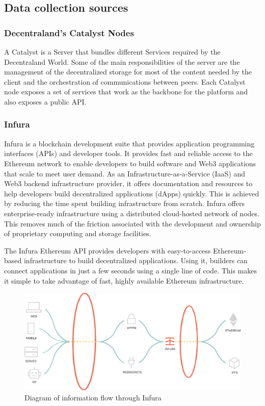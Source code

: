 \documentclass[MSE,Master,english]{twbook}%
\begin{document}
\subsection{Data collection sources}
\subsubsection{Decentraland's Catalyst Nodes}
A Catalyst\cite{catalyst} is a Server that bundles different Services required by the Decentraland World. Some of the main responsibilities of the server are the management of the decentralized storage for most of the content needed by the client and the orchestration of communications between peers. Each Catalyst node exposes a set of services that work as the backbone for the platform and also exposes a public API.


\subsubsection{Infura}
Infura\cite{infura} is a blockchain development suite that provides application programming interfaces (APIs) and developer tools. It provides fast and reliable access to the Ethereum network to enable developers to build software and Web3 applications that scale to meet user demand.
As an Infrastructure-as-a-Service (IaaS) and Web3 backend infrastructure provider, it offers documentation and resources to help developers build decentralized applications (dApps) quickly. This is achieved by reducing the time spent building infrastructure from scratch. Infura offers enterprise-ready infrastructure using a distributed cloud-hosted network of nodes. This removes much of the friction associated with the development and ownership of proprietary computing and storage facilities. 

The Infura Ethereum API provides developers with easy-to-access Ethereum-based infrastructure to build decentralized applications. Using it, builders can connect applications in just a few seconds using a single line of code. This makes it simple to take advantage of fast, highly available Ethereum infrastructure. 

\begin{figure}[H]
  \centering
  \includegraphics[width=\textwidth]{infura.png}
  \caption{Diagram of information flow through Infura \cite{infura}}
  \label{fig:infura}
\end{figure}
\end{document}
